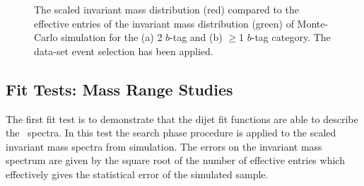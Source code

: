 \begin{figure}[!ht]
  \begin{center}
    \captionsetup[subfigure]{aboveskip=0pt,justification=centering}
  \end{center}
  \caption{The scaled invariant mass distribution (red) compared to the
    effective entries of the invariant mass distribution (green)
    of Monte-Carlo simulation for the (a) 2 $b$-tag and (b) $\geq$1 $b$-tag category.
    The \summer{} data-set event selection has been applied.}
  \label{fig:effEnt}
\end{figure}

\subsection{Fit Tests: Mass Range Studies}
\label{sec:bkg-summer_range}

The first fit test is to demonstrate that the dijet fit functions are able to describe the~\mjj{} spectra.
In this test the search phase procedure is applied to the scaled invariant mass spectra from simulation.
The errors on the invariant mass spectrum are given by the square root of the number of effective entries
which effectively gives the statistical error of the simulated sample.

